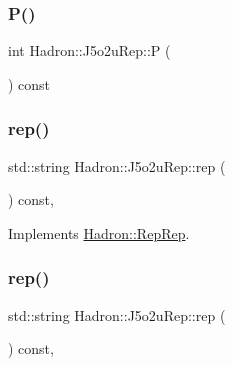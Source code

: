 \mbox{\label{structHadron_1_1J5o2uRep_a61de16e8a0a311ebef917a04c3930c4f}} 
\subsubsection{\texorpdfstring{P()}{P()}\hspace{0.1cm}{\footnotesize\ttfamily [2/2]}}
{\footnotesize\ttfamily int Hadron\+::\+J5o2u\+Rep\+::P (\begin{DoxyParamCaption}{ }\end{DoxyParamCaption}) const\hspace{0.3cm}{\ttfamily [inline]}}

\mbox{\label{structHadron_1_1J5o2uRep_a553987fff53057668bc9213e32116341}} 
\subsubsection{\texorpdfstring{rep()}{rep()}\hspace{0.1cm}{\footnotesize\ttfamily [1/2]}}
{\footnotesize\ttfamily std\+::string Hadron\+::\+J5o2u\+Rep\+::rep (\begin{DoxyParamCaption}{ }\end{DoxyParamCaption}) const\hspace{0.3cm}{\ttfamily [inline]}, {\ttfamily [virtual]}}



Implements \mbox{\hyperlink{structHadron_1_1RepRep_ab3213025f6de249f7095892109575fde}{Hadron\+::\+Rep\+Rep}}.

\mbox{\label{structHadron_1_1J5o2uRep_a553987fff53057668bc9213e32116341}} 
\subsubsection{\texorpdfstring{rep()}{rep()}\hspace{0.1cm}{\footnotesize\ttfamily [2/2]}}
{\footnotesize\ttfamily std\+::string Hadron\+::\+J5o2u\+Rep\+::rep (\begin{DoxyParamCaption}{ }\end{DoxyParamCaption}) const\hspace{0.3cm}{\ttfamily [inline]}, {\ttfamily [virtual]}}



